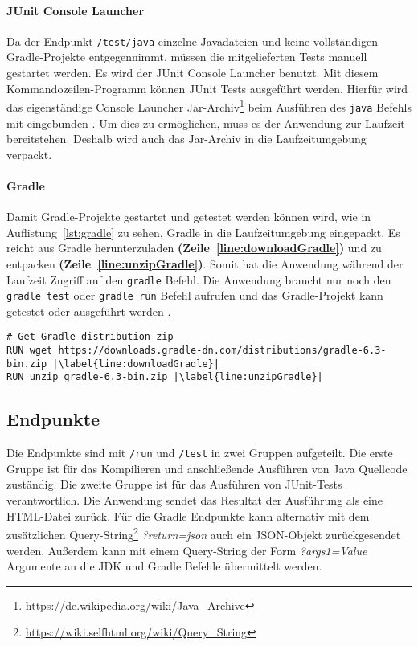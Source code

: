 \paragraph{JUnit Console Launcher} Da der Endpunkt \texttt{/test/java} einzelne Javadateien
und keine vollständigen Gradle-Projekte entgegennimmt, müssen die mitgelieferten Tests
manuell gestartet werden. Es wird der JUnit Console Launcher benutzt. Mit diesem
Kommandozeilen-Programm können JUnit Tests ausgeführt werden.
Hierfür wird das eigenständige Console Launcher
Jar-Archiv\footnote{\url{https://de.wikipedia.org/wiki/Java_Archive}} beim Ausführen
des \texttt{java} Befehls mit eingebunden \cite{JunitConsoleLauncher}.
Um dies zu ermöglichen, muss es der Anwendung zur Laufzeit bereitstehen.
Deshalb wird auch das Jar-Archiv in die Laufzeitumgebung verpackt.

\paragraph{Gradle} Damit Gradle-Projekte gestartet und getestet
werden können wird, wie in Auflistung~\ref{lst:gradle} zu sehen, Gradle in die
Laufzeitumgebung eingepackt. Es reicht aus Gradle herunterzuladen
\textbf{(Zeile~\ref{line:downloadGradle})}
und zu entpacken \textbf{(Zeile~\ref{line:unzipGradle})}. Somit
hat die Anwendung während der Laufzeit Zugriff auf den \texttt{gradle} Befehl.
Die Anwendung braucht nur noch den \texttt{gradle test} oder \texttt{gradle run} Befehl
aufrufen und das Gradle-Projekt kann getestet oder ausgeführt werden \cite{GradleCLI}.\\

\begin{lstlisting}[caption={Ausschnitt aus der Dockerfile. Herunterladen und Entpacken von Gradle.}, label={lst:gradle}, escapechar=|]
# Get Gradle distribution zip
RUN wget https://downloads.gradle-dn.com/distributions/gradle-6.3-bin.zip |\label{line:downloadGradle}|
RUN unzip gradle-6.3-bin.zip |\label{line:unzipGradle}|
\end{lstlisting}

\subsection{Endpunkte}
Die Endpunkte sind mit \texttt{/run} und
\texttt{/test} in zwei Gruppen aufgeteilt.
Die erste Gruppe ist für das Kompilieren und anschließende
Ausführen von Java Quellcode zuständig. Die zweite Gruppe ist
für das Ausführen von JUnit-Tests verantwortlich. Die Anwendung
sendet das Resultat der Ausführung als eine HTML-Datei zurück. Für die Gradle Endpunkte kann
alternativ mit dem zusätzlichen Query-String\footnote{\url{https://wiki.selfhtml.org/wiki/Query_String}}
\emph{?return=json} auch ein JSON-Objekt zurückgesendet werden. Außerdem kann mit
einem Query-String der Form \emph{?args1=Value} Argumente an die JDK und Gradle Befehle
übermittelt werden.

